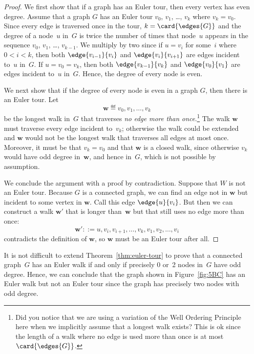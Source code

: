\begin{proof}
  We first show that if a graph has an Euler tour, then every vertex has
  even degree.  Assume that a graph $G$ has an Euler tour $v_0$, $v_1$,
  \dots, $v_k$ where $v_k = v_0$.  Since every edge is traversed once in
  the tour, $k = \card{\edges{G}}$ and the degree of a node~$u$ in~$G$ is
  twice the number of times that node~$u$ appears in the sequence $v_0$,
  $v_1$, \dots, $v_{k-1}$.  We multiply by two since if $u = v_i$ for
  some~$i$ where $0 < i < k$, then both $\edge{v_{i - 1}}{v_i}$ and
  $\edge{v_i}{v_{i + 1}}$ are edges incident to~$u$ in~$G$.  If $u = v_0 =
  v_k$, then both $\edge{v_{k - 1}}{v_k}$ and $\edge{v_0}{v_1}$ are edges
  incident to~$u$ in~$G$.  Hence, the degree of every node is even.

We next show that if the degree of every node is even in a graph
$G$, then there is an Euler tour.  Let
\[
\mathbf{w} \eqdef v_0, v_1, \dots, v_k
\]
be the longest walk in~$G$ that traverses \emph{no edge more than
  once}.\footnote{Did you notice that we are using a variation of the
  Well Ordering Principle here when we implicitly assume that a
  longest walk exists?  This is ok since the length of a walk where no
  edge is used more than once is at most~$\card{\edges{G}}$.}  The walk
$\mathbf{w}$ must traverse every edge incident to~$v_k$; otherwise the
walk could be extended and $\mathbf{w}$ would not be the longest walk
that traverses all edges at most once.  Moreover, it must be that $v_k
= v_0$ and that $\mathbf{w}$ is a closed walk, since otherwise $v_k$
would have odd degree in~$\mathbf{w}$, and hence in~$G$, which is not
possible by assumption.

We conclude the argument with a proof by contradiction.  Suppose that
$W$ is not an Euler tour.  Because $G$ is a connected graph, we can
find an edge not in $\mathbf{w}$ but incident to some vertex in $\mathbf{w}$.  Call this
edge $\edge{u}{v_i}$.  But then we can construct a walk $\mathbf{w}'$ that is
longer than~$\mathbf{w}$ but that still uses no edge more than once:
\[
   \mathbf{w}' ::= u, v_i, v_{i + 1}, \dots, v_k, v_1, v_2, \dots, v_i
\]
contradicts the definition of $\mathbf{w}$, so $\mathbf{w}$ must be an
Euler tour after all.
\end{proof}

It is not difficult to extend Theorem~\ref{thm:euler-tour} to prove that a
connected graph~$G$ has an Euler walk if and only if precisely 0 or~2
nodes in~$G$ have odd degree.  Hence, we can conclude that the graph
shown in Figure~\ref{fig:5BC} has an Euler walk but not an Euler tour
since the graph has precisely two nodes with odd degree.


